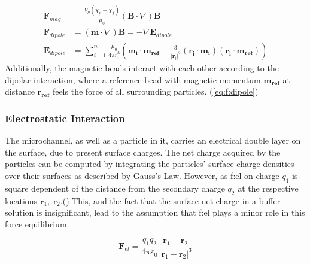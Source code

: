 \begin{align}	
	\mathbf{F}_{mag} &=\frac{V_{p}\left(\chi_{p}-\chi_{f}\right)}{\mu_{0}}(\mathbf{B} \cdot \nabla) \mathbf{B} \label{eq:f:mag}	\\
	\mathbf{F}_{dipole} &=\left(\mathbf{m}\cdot \nabla \right) \mathbf{B} = -\nabla \mathbf{E}_{dipole}\\
	\mathbf{E}_{dipole}&=\sum_{i-1}^{n} \frac{\mu_{0}}{4 \pi r_{i}^{3}}\left(\mathbf{m}_{\mathbf{i}} \cdot \mathbf{m}_{\mathbf{ref}}-\frac{3}{|\mathbf{r}_{i}|^{2}}\left(\mathbf{r}_{\mathbf{i}} \cdot \mathbf{m}_{\mathbf{i}}\right)\left(\mathbf{r}_{\mathbf{i}} \cdot \mathbf{m}_{\mathbf{ref}}\right)\right)  \label{eq:f:dipole}
\end{align}
Additionally, the magnetic beads interact with each other according to the dipolar interaction, where a reference bead with magnetic momentum $\mathbf{m}_{\mathbf{ref}}$ at distance $\mathbf{r}_{\mathbf{ref}}$ feels the force of all surrounding particles. (\cref{eq:f:dipole})


\subsubsection{Electrostatic Interaction}
The microchannel, as well as a particle in it, carries an electrical double layer on the surface, due to present surface charges. The net charge acquired by the particles can be computed by integrating the particles’ surface charge densities over their surfaces as described by Gauss’s Law. However, as \gls{f:el} on charge $q_1$ is square dependent of the distance from the secondary charge $q_2$ at the respective locations $\mathbf{r}_{1},\ \mathbf{r}_{2}$.() This, and the fact that the surface net charge in a buffer solution is insignificant, lead to the assumption that \gls{f:el} plays a minor role in this force equilibrium. 

\begin{equation}
	\mathbf{F}_{el}=\frac{q_{1} q_{2}}{4 \pi \varepsilon_{0}} \frac{\mathbf{r}_{1}-\mathbf{r}_{2}}{\left|\mathbf{r}_{1}-\mathbf{r}_{2}\right|^{3}} \label{eq:f:el}
\end{equation}

